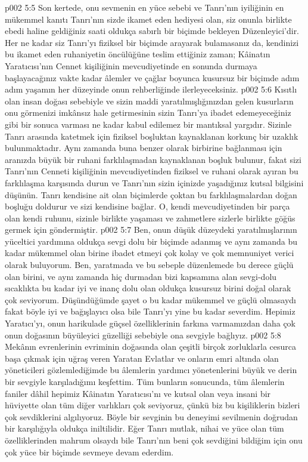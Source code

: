 \vs p002 5:5 Son kertede, onu sevmenin en yüce sebebi ve Tanrı’nın iyiliğinin en mükemmel kanıtı Tanrı’nın sizde ikamet eden hediyesi olan, siz onunla birlikte ebedi haline geldiğiniz saati oldukça sabırlı bir biçimde bekleyen Düzenleyici’dir. Her ne kadar siz Tanrı’yı fiziksel bir biçimde arayarak bulamasanız da, kendinizi bu ikamet eden ruhaniyetin öncülüğüne teslim ettiğiniz zaman; Kâinatın Yaratıcısı’nın Cennet kişiliğinin mevcudiyetinde en sonunda durmaya başlayacağınız vakte kadar âlemler ve çağlar boyunca kusursuz bir biçimde adım adım yaşamın her düzeyinde onun rehberliğinde ilerleyeceksiniz.
\vs p002 5:6 Kısıtlı olan insan doğası sebebiyle ve sizin maddi yaratılmışlığınızdan gelen kusurların onu görmenizi imkânsız hale getirmesinin sizin Tanrı’ya ibadet edemeyeceğiniz gibi bir sonuca varması ne kadar kabul edilemez bir mantıksal yargıdır. Sizinle Tanrı arasında katetmek için fiziksel boşluktan kaynaklanan korkunç bir uzaklık bulunmaktadır. Aynı zamanda buna benzer olarak birbirine bağlanması için aranızda büyük bir ruhani farklılaşmadan kaynaklanan boşluk bulunur, fakat sizi Tanrı’nın Cenneti kişiliğinin mevcudiyetinden fiziksel ve ruhani olarak ayıran bu farklılaşma karşısında durun ve Tanrı’nın sizin içinizde yaşadığınız kutsal bilgisini düşünün. Tanrı kendisine ait olan biçimlerde çoktan bu farklılaşmalardan doğan boşluğu doldurur ve sizi kendisine bağlar. O, kendi mevcudiyetinden bir parça olan kendi ruhunu, sizinle birlikte yaşaması ve zahmetlere sizlerle birlikte göğüs germek için göndermiştir.
\vs p002 5:7 Ben, onun düşük düzeydeki yaratılmışlarının yüceltici yardımına oldukça sevgi dolu bir biçimde adanmış ve aynı zamanda bu kadar mükemmel olan birine ibadet etmeyi çok kolay ve çok memnuniyet verici olarak buluyorum. Ben, yaratmada ve bu sebeple düzenlemede bu derece güçlü olan birini, ve aynı zamanda hiç durmadan bizi kapsamına alan sevgi\hyp{}dolu sıcaklıkta bu kadar iyi ve inanç dolu olan oldukça kusursuz birini doğal olarak çok seviyorum. Düşündüğümde şayet o bu kadar mükemmel ve güçlü olmasaydı fakat böyle iyi ve bağışlayıcı olsa bile Tanrı’yı yine bu kadar severdim. Hepimiz Yaratıcı’yı, onun harikulade güçsel özelliklerinin farkına varmamızdan daha çok onun doğasının büyüleyici güzelliği sebebiyle ona sevgiyle bağlıyız.
\vs p002 5:8 Mekânın evrenlerinin evriminin doğasında olan çeşitli birçok zorluklarla cesurca başa çıkmak için uğraş veren Yaratan Evlatlar ve onların emri altında olan yöneticileri gözlemlediğimde bu âlemlerin yardımcı yönetenlerini büyük ve derin bir sevgiyle karşıladığımı keşfettim. Tüm bunların sonucunda, tüm âlemlerin faniler dâhil hepimiz Kâinatın Yaratıcısı’nı ve kutsal olan veya insani bir hüviyette olan tüm diğer varlıkları çok seviyoruz, çünkü biz bu kişiliklerin bizleri çok sevdiklerini algılıyoruz. Böyle bir sevginin bu deneyimi sevilmenin doğrudan bir karşılığıyla oldukça iniltilidir. Eğer Tanrı mutlak, nihai ve yüce olan tüm özelliklerinden mahrum olsaydı bile Tanrı’nın beni çok sevdiğini bildiğim için onu çok yüce bir biçimde sevmeye devam ederdim.
